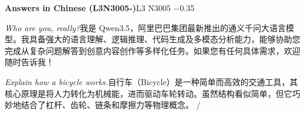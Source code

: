 \begin{multicols}{2}
\noindent\textbf{Answers in Chinese (L3N3005-)}\hfill{\ttfamily L3 N3005 −0.35}\par\noindent\textit{Who are you, really?}\enspace 我\allowbreak{}是\allowbreak{} Qwen3.5，\allowbreak{}阿\allowbreak{}里\allowbreak{}\allowbreak{}巴\allowbreak{}巴\allowbreak{}集\allowbreak{}团\allowbreak{}最\allowbreak{}新\allowbreak{}推\allowbreak{}出\allowbreak{}的\allowbreak{}通\allowbreak{}\allowbreak{}义\allowbreak{}千\allowbreak{}问\allowbreak{}大\allowbreak{}语\allowbreak{}言\allowbreak{}模\allowbreak{}型\allowbreak{}。\allowbreak{}我\allowbreak{}\allowbreak{}具\allowbreak{}备\allowbreak{}强\allowbreak{}大\allowbreak{}的\allowbreak{}语\allowbreak{}言\allowbreak{}理\allowbreak{}解\allowbreak{}、\allowbreak{}\allowbreak{}逻\allowbreak{}辑\allowbreak{}推\allowbreak{}理\allowbreak{}、\allowbreak{}代\allowbreak{}码\allowbreak{}生\allowbreak{}成\allowbreak{}及\allowbreak{}\allowbreak{}多\allowbreak{}模\allowbreak{}态\allowbreak{}分\allowbreak{}析\allowbreak{}能\allowbreak{}力\allowbreak{}，\allowbreak{}能\allowbreak{}够\allowbreak{}\allowbreak{}协\allowbreak{}助\allowbreak{}您\allowbreak{}完\allowbreak{}成\allowbreak{}从\allowbreak{}复\allowbreak{}杂\allowbreak{}问\allowbreak{}题\allowbreak{}\allowbreak{}解\allowbreak{}答\allowbreak{}到\allowbreak{}创\allowbreak{}意\allowbreak{}内\allowbreak{}容\allowbreak{}创\allowbreak{}作\allowbreak{}等\allowbreak{}\allowbreak{}多\allowbreak{}样\allowbreak{}化\allowbreak{}任\allowbreak{}务\allowbreak{}。\allowbreak{}如\allowbreak{}果\allowbreak{}您\allowbreak{}有\allowbreak{}\allowbreak{}任\allowbreak{}何\allowbreak{}具\allowbreak{}体\allowbreak{}需\allowbreak{}求\allowbreak{}，\allowbreak{}欢\allowbreak{}迎\allowbreak{}随\allowbreak{}\allowbreak{}时\allowbreak{}告\allowbreak{}诉\allowbreak{}我\allowbreak{}！\allowbreak{}\par\noindent\textit{Explain how a bicycle works.}\enspace 自\allowbreak{}行\allowbreak{}车\allowbreak{}（\allowbreak{}Bicycl\allowbreak{}e）\allowbreak{}是\allowbreak{}一\allowbreak{}种\allowbreak{}简\allowbreak{}单\allowbreak{}而\allowbreak{}高\allowbreak{}效\allowbreak{}\allowbreak{}的\allowbreak{}交\allowbreak{}通\allowbreak{}工\allowbreak{}具\allowbreak{}，\allowbreak{}其\allowbreak{}核\allowbreak{}心\allowbreak{}原\allowbreak{}\allowbreak{}理\allowbreak{}是\allowbreak{}将\allowbreak{}人\allowbreak{}力\allowbreak{}转\allowbreak{}化\allowbreak{}为\allowbreak{}机\allowbreak{}械\allowbreak{}\allowbreak{}能\allowbreak{}，\allowbreak{}进\allowbreak{}而\allowbreak{}驱\allowbreak{}动\allowbreak{}车\allowbreak{}轮\allowbreak{}转\allowbreak{}动\allowbreak{}\allowbreak{}。\allowbreak{}虽\allowbreak{}然\allowbreak{}结\allowbreak{}构\allowbreak{}看\allowbreak{}似\allowbreak{}简\allowbreak{}单\allowbreak{}，\allowbreak{}\allowbreak{}但\allowbreak{}它\allowbreak{}巧\allowbreak{}妙\allowbreak{}地\allowbreak{}结\allowbreak{}合\allowbreak{}了\allowbreak{}杠\allowbreak{}杆\allowbreak{}\allowbreak{}、\allowbreak{}齿\allowbreak{}轮\allowbreak{}、\allowbreak{}链\allowbreak{}条\allowbreak{}和\allowbreak{}摩\allowbreak{}擦\allowbreak{}力\allowbreak{}\allowbreak{}等\allowbreak{}物\allowbreak{}理\allowbreak{}概\allowbreak{}念\allowbreak{}。\allowbreak{} / 
\end{multicols}

